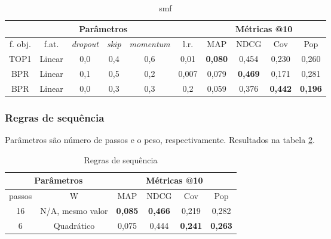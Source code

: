 \begin{table}[htbp]
  \centering
  \begin{tabular}{|c|c|c|c|c|c|c|c|c|c|}
    \hline
      \multicolumn{6}{|c|}{Parâmetros} & \multicolumn{4}{c|}{Métricas @10} \\
      \hline
      f. obj. & f.at. & \textit{dropout} & \textit{skip} & \textit{momentum} & l.r. & MAP & NDCG & Cov & Pop \\
      \hline
      TOP1 & Linear & 0,0 & 0,4 & 0,6 & 0,01 & \textbf{0,080} & 0,454 & 0,230 & 0,260 \\
      \hline
      BPR & Linear & 0,1 & 0,5 & 0,2 & 0,007 & 0,079 & \textbf{0,469} & 0,171 & 0,281 \\
      \hline
      BPR & Linear & 0,0 & 0,3 & 0,3 & 0,2 & 0,059 & 0,376 & \textbf{0,442} & \textbf{0,196} \\
      \hline
\end{tabular}
      \caption{smf}
      \label{opt:smf_rem}
\end{table}

\subsubsection{Regras de sequência}
Parâmetros são número de passos e o peso, respectivamente. Resultados na tabela
\ref{opt:sr_rem}.

\begin{table}[htbp]
  \centering
  \begin{tabular}{|c|c|c|c|c|c|}
    \hline
      \multicolumn{2}{|c|}{Parâmetros} & \multicolumn{4}{c|}{Métricas @10} \\
      \hline
      passos & W & MAP & NDCG & Cov & Pop \\
      \hline
      16 & N/A, mesmo valor & \textbf{0,085} & \textbf{0,466} & 0,219 & 0,282 \\
      \hline
      6 & Quadrático & 0,075 & 0,444 & \textbf{0,241} & \textbf{0,263} \\
      \hline
\end{tabular}
      \caption{Regras de sequência}
      \label{opt:sr_rem}
\end{table}

